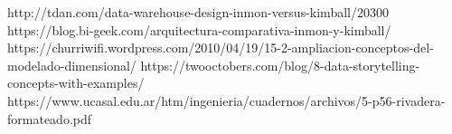 \documentclass[preprint,12pt]{elsarticle}
\begin{document}
	
	

	
	
	\newpage
	
	   \begin{thebibliography}{0}
                  http://tdan.com/data-warehouse-design-inmon-versus-kimball/20300
                   https://blog.bi-geek.com/arquitectura-comparativa-inmon-y-kimball/
                   https://churriwifi.wordpress.com/2010/04/19/15-2-ampliacion-conceptos-del-modelado-dimensional/
                     https://twooctobers.com/blog/8-data-storytelling-concepts-with-examples/
                   https://www.ucasal.edu.ar/htm/ingenieria/cuadernos/archivos/5-p56-rivadera-formateado.pdf

         \end{thebibliography}
	
\end{document}
